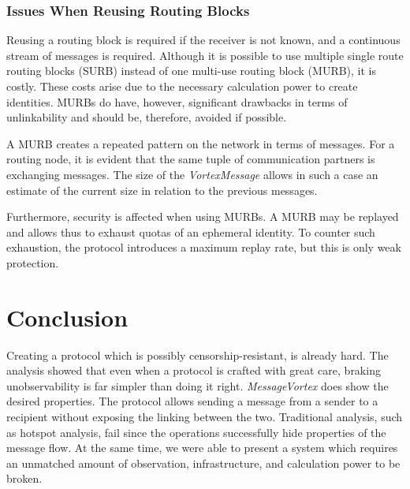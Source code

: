 \documentclass[acmsmall, screen]{acmart}
\begin{document}
\subsubsection{Issues When Reusing Routing Blocks}
Reusing a routing block is required if the receiver is not known, and a continuous stream of messages is required. Although it is possible to use multiple single route routing blocks (SURB) instead of one multi-use routing block (MURB), it is costly. These costs arise due to the necessary calculation power to create identities. MURBs do have, however, significant drawbacks in terms of unlinkability and should be, therefore, avoided if possible.

A MURB creates a repeated pattern on the network in terms of messages. For a routing node, it is evident that the same tuple of communication partners is exchanging messages. The size of the \emph{VortexMessage} allows in such a case an estimate of the current size in relation to the previous messages.

Furthermore, security is affected when using MURBs. A MURB may be replayed and allows thus to exhaust quotas of an ephemeral identity. To counter such exhaustion, the protocol introduces a maximum replay rate, but this is only weak protection.

\section{Conclusion}
Creating a protocol which is possibly censorship-resistant, is already hard. The analysis showed that even when a protocol is crafted with great care, braking unobservability is far simpler than doing it right. \emph{MessageVortex} does show the desired properties. The protocol allows sending a message from a sender to a recipient without exposing the linking between the two. Traditional analysis, such as hotspot analysis, fail since the operations successfully hide properties of the message flow. At the same time, we were able to present a system which requires an unmatched amount of observation, infrastructure, and calculation power to be broken.
\end{document}
